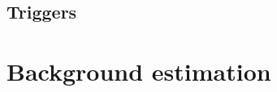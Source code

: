 \subsection{Triggers}
\label{sec:svj_triggers}



\section{Background estimation}
\label{sec:svj_background_est}
